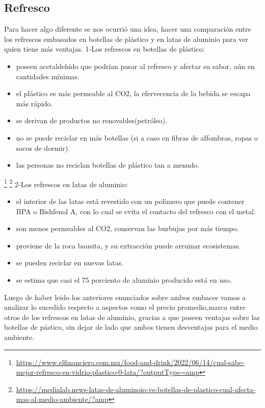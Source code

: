 \documentclass[a4paper,11pt]{article}
\begin{document}
\subsection{Refresco}
Para hacer algo diferente se nos ocurrió una idea, hacer una comparación entre los refrescos embasados en botellas de plástico y en latas de aluminio para ver quien tiene más ventajas. 
1-Los refrescos en botellas de plástico:
\begin{itemize}
\item poseen acetaldehído que podrían pasar al refresco y afectar su sabor, aún en cantidades mínimas.
\item el plástico es más permeable al CO2, la efervecencia de la bebida se escapa más rápido.
\item se derivan de productos no renovables(petróleo).
\item no se puede reciclar en más botellas (si a caso en fibras de alfombras, ropas o sacos de dormir).
\item las personas no reciclan botellas de plástico tan a menudo.
\end{itemize}
\footnote{\href{https://www.elfinanciero.com.mx/food-and-drink/2022/06/14/cual-sabe-mejor-refresco-en-vidrio-plastico-0-lata/?outputType=amp}{https://www.elfinanciero.com.mx/food-and-drink/2022/06/14/cual-sabe-mejor-refresco-en-vidrio-plastico-0-lata/?outputType=amp}}
\footnote{\href{https://medialab.news-latas-de-aluminoio-vs-botellas-de-plastico-cual-afecta-mas-al-medio-ambiente/?amp}{https://medialab.news-latas-de-aluminoio-vs-botellas-de-plastico-cual-afecta-mas-al-medio-ambiente/?amp}}
2-Los refrescos en latas de aluminio:
\begin{itemize}
\item el interior de las latas está revestido con un polímero que puede contener BPA o Bishfenol A, con lo cual se evita el contacto del refresco con el metal.
\item son menos permeables al CO2, conservan las burbujas por más tiempo.
\item proviene de la roca bausita, y su extracción puede arruinar ecosistemas.
\item se pueden reciclar en nuevas latas.
\item se estima que casi el 75 porciento de aluminio producido está en uso.
\end{itemize}
Luego de haber leido los anteriores enunciados sobre ambos embaces vamos a analizar lo sucedido respecto a aspectos como el precio promedio,marca entre otros de los refrescos en latas de aluminio, gracias a que poseen ventajas sobre las botellas de pástico, sin dejar de lado que ambos tienen desventajas para el medio ambiente.
\end{document}
